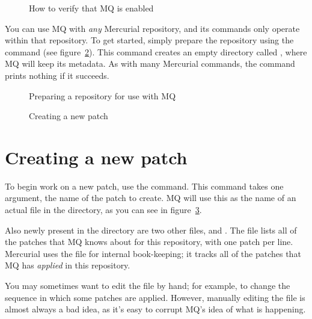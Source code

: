 \begin{figure}[ht]
  \caption{How to verify that MQ is enabled}
  \label{ex:mq:enabled}
\end{figure}

You can use MQ with \emph{any} Mercurial repository, and its commands
only operate within that repository.  To get started, simply prepare
the repository using the  command (see
figure~\ref{ex:mq:qinit}).  This command creates an empty directory
called , where MQ will keep its metadata.  As
with many Mercurial commands, the  command prints nothing
if it succeeds.

\begin{figure}[ht]
  \caption{Preparing a repository for use with MQ}
  \label{ex:mq:qinit}
\end{figure}

\begin{figure}[ht]
  \caption{Creating a new patch}
  \label{ex:mq:qnew}
\end{figure}

\section{Creating a new patch}

To begin work on a new patch, use the  command.  This
command takes one argument, the name of the patch to create.  MQ will
use this as the name of an actual file in the 
directory, as you can see in figure~\ref{ex:mq:qnew}.

Also newly present in the  directory are two
other files,  and .  The
 file lists all of the patches that MQ knows about
for this repository, with one patch per line.  Mercurial uses the
 file for internal book-keeping; it tracks all of the
patches that MQ has \emph{applied} in this repository.

\begin{note}
  You may sometimes want to edit the  file by hand;
  for example, to change the sequence in which some patches are
  applied.  However, manually editing the  file is
  almost always a bad idea, as it's easy to corrupt MQ's idea of what
  is happening.
\end{note}

